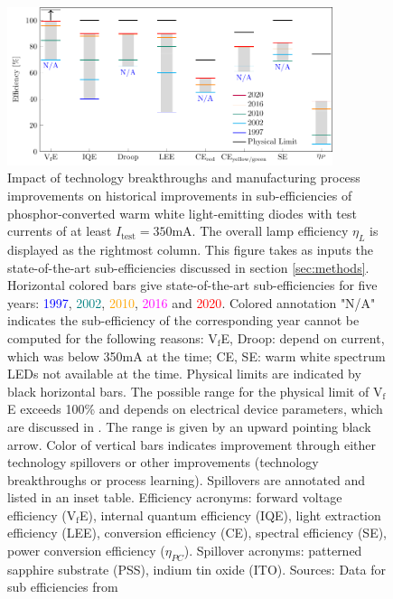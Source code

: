 \documentclass[a4paper,nocompress]{spie}  %
\begin{document}
\begin{figure} [ht]
    \begin{center}
        \includegraphics[width=0.85\textwidth]{SPIE/article/breakthroughs_efficiency.pdf}
    \end{center}
    \caption{Impact of technology breakthroughs and manufacturing process improvements on historical improvements in sub-efficiencies of phosphor-converted warm white light-emitting diodes with test currents of at least $I_\text{test}=350$mA. The overall lamp efficiency $\eta_L$ is displayed as the rightmost column. This figure takes as inputs the state-of-the-art sub-efficiencies discussed in section \ref{sec:methods}. Horizontal colored bars give state-of-the-art sub-efficiencies for five years: \textcolor{blue}{1997}, \textcolor{teal}{2002}, \textcolor{orange}{2010}, \textcolor{magenta}{2016} and \textcolor{red}{2020}. Colored annotation "N/A" indicates the sub-efficiency of the corresponding year cannot be computed for the following reasons: V$_\text{f}$E, Droop: depend on current, which was below 350mA at the time; CE, SE: warm white spectrum LEDs not available at the time. Physical limits are indicated by black horizontal bars. The possible range for the physical limit of V$_\text{f}$E exceeds 100\% and depends on electrical device parameters, which are discussed in \cite{david2016electrical}. The range is given by an upward pointing black arrow. Color of vertical bars indicates improvement through either technology spillovers or other improvements (technology breakthroughs or process learning). Spillovers are annotated and listed in an inset table. Efficiency acronyms: forward voltage efficiency (V$_\text{f}$E), internal quantum efficiency (IQE), light extraction efficiency (LEE), conversion efficiency (CE), spectral efficiency (SE), power conversion efficiency ($\eta_{PC}$). Spillover acronyms: patterned sapphire substrate (PSS), indium tin oxide (ITO). Sources: Data for sub efficiencies from \cite{weinold2020technology}}
    \label{fig:efficiency}
\end{figure}
\end{document}
